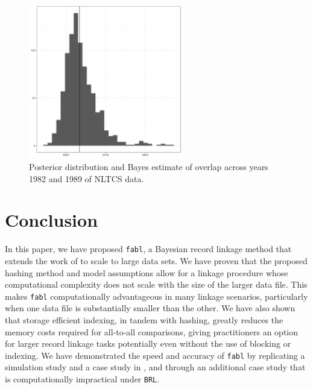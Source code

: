 \documentclass[ba]{imsart}
\begin{document}
	\begin{figure}[h]
		\begin{center}
 		\includegraphics[width=0.6\textwidth]{../notes/figures/nltcs/overlap_posterior4}
			\caption{Posterior distribution and Bayes estimate of overlap across years 1982 and 1989 of NLTCS data.}
			\label{fig:nltcs-overlap-plot}
		\end{center}
	\end{figure}
	
	
	\section{Conclusion}
	\label{discussion}
	
	In this paper, we have proposed \texttt{fabl}, a Bayesian record linkage method that extends the work of \cite{sadinle_bayesian_2017} to scale to large data sets. We have proven that the proposed hashing method and model assumptions allow for a linkage procedure whose computational complexity does not scale with the size of the larger data file. This makes \texttt{fabl} computationally advantageous in many linkage scenarios, particularly when one data file is substantially smaller than the other. We have also shown that storage efficient indexing, in tandem with hashing, greatly reduces the memory costs required for all-to-all comparisons, giving practitioners an option for larger record linkage tasks potentially even without the use of blocking or indexing. We have demonstrated the speed and accuracy of \texttt{fabl} by replicating a simulation study and a case study in \cite{sadinle_bayesian_2017}, and through an additional case study that is computationally impractical under \texttt{BRL}. 
	
\end{document}
